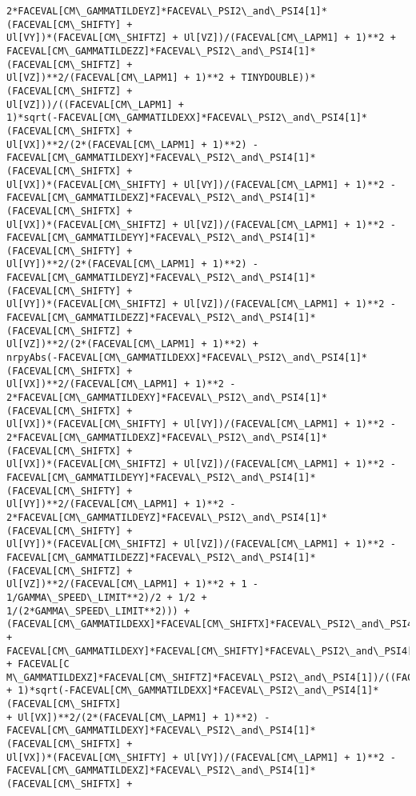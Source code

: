 \documentclass[landscape,letterpaper,10pt,english]{article}
\begin{document}
\begin{Verbatim}[commandchars=\\\{\}]
2*FACEVAL[CM\_GAMMATILDEYZ]*FACEVAL\_PSI2\_and\_PSI4[1]*(FACEVAL[CM\_SHIFTY] +
Ul[VY])*(FACEVAL[CM\_SHIFTZ] + Ul[VZ])/(FACEVAL[CM\_LAPM1] + 1)**2 +
FACEVAL[CM\_GAMMATILDEZZ]*FACEVAL\_PSI2\_and\_PSI4[1]*(FACEVAL[CM\_SHIFTZ] +
Ul[VZ])**2/(FACEVAL[CM\_LAPM1] + 1)**2 + TINYDOUBLE))*(FACEVAL[CM\_SHIFTZ] +
Ul[VZ]))/((FACEVAL[CM\_LAPM1] +
1)*sqrt(-FACEVAL[CM\_GAMMATILDEXX]*FACEVAL\_PSI2\_and\_PSI4[1]*(FACEVAL[CM\_SHIFTX] +
Ul[VX])**2/(2*(FACEVAL[CM\_LAPM1] + 1)**2) -
FACEVAL[CM\_GAMMATILDEXY]*FACEVAL\_PSI2\_and\_PSI4[1]*(FACEVAL[CM\_SHIFTX] +
Ul[VX])*(FACEVAL[CM\_SHIFTY] + Ul[VY])/(FACEVAL[CM\_LAPM1] + 1)**2 -
FACEVAL[CM\_GAMMATILDEXZ]*FACEVAL\_PSI2\_and\_PSI4[1]*(FACEVAL[CM\_SHIFTX] +
Ul[VX])*(FACEVAL[CM\_SHIFTZ] + Ul[VZ])/(FACEVAL[CM\_LAPM1] + 1)**2 -
FACEVAL[CM\_GAMMATILDEYY]*FACEVAL\_PSI2\_and\_PSI4[1]*(FACEVAL[CM\_SHIFTY] +
Ul[VY])**2/(2*(FACEVAL[CM\_LAPM1] + 1)**2) -
FACEVAL[CM\_GAMMATILDEYZ]*FACEVAL\_PSI2\_and\_PSI4[1]*(FACEVAL[CM\_SHIFTY] +
Ul[VY])*(FACEVAL[CM\_SHIFTZ] + Ul[VZ])/(FACEVAL[CM\_LAPM1] + 1)**2 -
FACEVAL[CM\_GAMMATILDEZZ]*FACEVAL\_PSI2\_and\_PSI4[1]*(FACEVAL[CM\_SHIFTZ] +
Ul[VZ])**2/(2*(FACEVAL[CM\_LAPM1] + 1)**2) +
nrpyAbs(-FACEVAL[CM\_GAMMATILDEXX]*FACEVAL\_PSI2\_and\_PSI4[1]*(FACEVAL[CM\_SHIFTX] +
Ul[VX])**2/(FACEVAL[CM\_LAPM1] + 1)**2 -
2*FACEVAL[CM\_GAMMATILDEXY]*FACEVAL\_PSI2\_and\_PSI4[1]*(FACEVAL[CM\_SHIFTX] +
Ul[VX])*(FACEVAL[CM\_SHIFTY] + Ul[VY])/(FACEVAL[CM\_LAPM1] + 1)**2 -
2*FACEVAL[CM\_GAMMATILDEXZ]*FACEVAL\_PSI2\_and\_PSI4[1]*(FACEVAL[CM\_SHIFTX] +
Ul[VX])*(FACEVAL[CM\_SHIFTZ] + Ul[VZ])/(FACEVAL[CM\_LAPM1] + 1)**2 -
FACEVAL[CM\_GAMMATILDEYY]*FACEVAL\_PSI2\_and\_PSI4[1]*(FACEVAL[CM\_SHIFTY] +
Ul[VY])**2/(FACEVAL[CM\_LAPM1] + 1)**2 -
2*FACEVAL[CM\_GAMMATILDEYZ]*FACEVAL\_PSI2\_and\_PSI4[1]*(FACEVAL[CM\_SHIFTY] +
Ul[VY])*(FACEVAL[CM\_SHIFTZ] + Ul[VZ])/(FACEVAL[CM\_LAPM1] + 1)**2 -
FACEVAL[CM\_GAMMATILDEZZ]*FACEVAL\_PSI2\_and\_PSI4[1]*(FACEVAL[CM\_SHIFTZ] +
Ul[VZ])**2/(FACEVAL[CM\_LAPM1] + 1)**2 + 1 - 1/GAMMA\_SPEED\_LIMIT**2)/2 + 1/2 +
1/(2*GAMMA\_SPEED\_LIMIT**2))) +
(FACEVAL[CM\_GAMMATILDEXX]*FACEVAL[CM\_SHIFTX]*FACEVAL\_PSI2\_and\_PSI4[1] +
FACEVAL[CM\_GAMMATILDEXY]*FACEVAL[CM\_SHIFTY]*FACEVAL\_PSI2\_and\_PSI4[1] + FACEVAL[C
M\_GAMMATILDEXZ]*FACEVAL[CM\_SHIFTZ]*FACEVAL\_PSI2\_and\_PSI4[1])/((FACEVAL[CM\_LAPM1]
+ 1)*sqrt(-FACEVAL[CM\_GAMMATILDEXX]*FACEVAL\_PSI2\_and\_PSI4[1]*(FACEVAL[CM\_SHIFTX]
+ Ul[VX])**2/(2*(FACEVAL[CM\_LAPM1] + 1)**2) -
FACEVAL[CM\_GAMMATILDEXY]*FACEVAL\_PSI2\_and\_PSI4[1]*(FACEVAL[CM\_SHIFTX] +
Ul[VX])*(FACEVAL[CM\_SHIFTY] + Ul[VY])/(FACEVAL[CM\_LAPM1] + 1)**2 -
FACEVAL[CM\_GAMMATILDEXZ]*FACEVAL\_PSI2\_and\_PSI4[1]*(FACEVAL[CM\_SHIFTX] +

\end{Verbatim}
\end{document}

